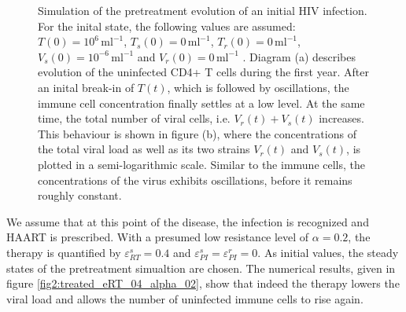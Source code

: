 \begin{figure}
    \caption[]{Simulation of the pretreatment evolution of an initial HIV infection.
    For the inital state, the following values are assumed: $T(0) = 10^{6} \, \text{ml}^{-1}$, $T_s(0) = 0 \, \text{ml}^{-1}$, 
    $T_r(0) = 0 \, \text{ml}^{-1}$, $V_s(0) = 10^{-6} \, \text{ml}^{-1}$ and $V_r(0) = 0 \, \text{ml}^{-1}$ \cite{perelson1993dynamics}.
    Diagram (a) describes evolution of the uninfected CD4+ T cells during the first year.
    After an inital break-in of $T(t)$, which is followed by oscillations, the immune cell concentration finally settles at a low level.
    At the same time, the total number of viral cells, i.e. $V_r(t) + V_s(t)$ increases.
    This behaviour is shown in figure (b), where the concentrations of the total viral load as well as its two strains $V_r(t)$ and $V_s(t)$, is plotted in a semi-logarithmic scale.
    Similar to the immune cells, the concentrations of the virus exhibits oscillations, before it remains roughly constant.}
    \label{fig:untreated}
\end{figure}

We assume that at this point of the disease, the infection is recognized and HAART is prescribed.
With a presumed low resistance level of $\alpha = 0.2$, the therapy is quantified by $\varepsilon_{RT}^{s} = 0.4$ and $\varepsilon_{PI}^{s} = \varepsilon_{PI}^{r} = 0$.
As initial values, the steady states of the pretreatment simualtion are chosen.\newline
The numerical results, given in figure \ref{fig2:treated_eRT_04_alpha_02}, show that indeed the therapy lowers the viral load and allows the 
number of uninfected immune cells to rise again.

